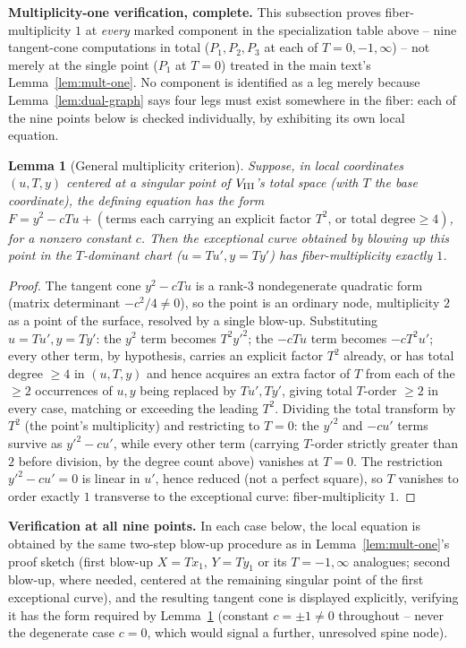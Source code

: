 \documentclass[11pt]{amsart}
\newtheorem{lemma}[theorem]{Lemma}
\theoremstyle{definition}
\begin{document}
\textbf{Multiplicity-one verification, complete.} This subsection proves
fiber-multiplicity $1$ at \emph{every} marked component in the
specialization table above -- nine tangent-cone computations in total
($P_1,P_2,P_3$ at each of $T=0,-1,\infty$) -- not merely at the single
point ($P_1$ at $T=0$) treated in the main text's Lemma~\ref{lem:mult-one}.
No component is identified as a leg merely because Lemma~\ref{lem:dual-graph}
says four legs must exist somewhere in the fiber: each of the nine points
below is checked individually, by exhibiting its own local equation.

\begin{lemma}[General multiplicity criterion]
\label{lem:general-mult-one}
Suppose, in local coordinates $(u,T,y)$ centered at a singular point of
$V_{\rm III}$'s total space (with $T$ the base coordinate), the defining
equation has the form $F=y^2-cTu+(\text{terms each carrying an explicit
factor }T^2\text{, or total degree}\geq4)$, for a nonzero constant $c$.
Then the exceptional curve obtained by blowing up this point in the
$T$-dominant chart ($u=Tu',y=Ty'$) has fiber-multiplicity exactly $1$.
\end{lemma}

\begin{proof}
The tangent cone $y^2-cTu$ is a rank-$3$ nondegenerate quadratic form
(matrix determinant $-c^2/4\neq0$), so the point is an ordinary node,
multiplicity $2$ as a point of the surface, resolved by a single
blow-up. Substituting $u=Tu',y=Ty'$: the $y^2$ term becomes $T^2y'^2$;
the $-cTu$ term becomes $-cT^2u'$; every other term, by hypothesis,
carries an explicit factor $T^2$ already, or has total degree $\geq4$ in
$(u,T,y)$ and hence acquires an extra factor of $T$ from each of the
$\geq2$ occurrences of $u,y$ being replaced by $Tu',Ty'$, giving total
$T$-order $\geq2$ in every case, matching or exceeding the leading $T^2$.
Dividing the total transform by $T^2$ (the point's multiplicity) and
restricting to $T=0$: the $y'^2$ and $-cu'$ terms survive as
$y'^2-cu'$, while every other term (carrying $T$-order strictly greater
than $2$ before division, by the degree count above) vanishes at $T=0$.
The restriction $y'^2-cu'=0$ is linear in $u'$, hence reduced (not a
perfect square), so $T$ vanishes to order exactly $1$ transverse to the
exceptional curve: fiber-multiplicity $1$.
\end{proof}

\textbf{Verification at all nine points.} In each case below, the local
equation is obtained by the same two-step blow-up procedure as in
Lemma~\ref{lem:mult-one}'s proof sketch (first blow-up $X=T x_1,\,Y=Ty_1$
or its $T=-1,\infty$ analogues; second blow-up, where needed, centered at
the remaining singular point of the first exceptional curve), and the
resulting tangent cone is displayed explicitly, verifying it has the
form required by Lemma~\ref{lem:general-mult-one} (constant $c=\pm1\neq0$
throughout -- never the degenerate case $c=0$, which would signal a
further, unresolved spine node).
\end{document}
